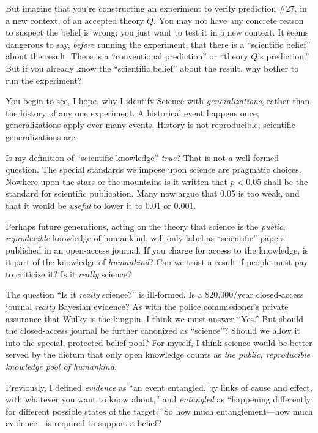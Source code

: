 {
 But imagine that you're constructing an experiment
to verify prediction \#27, in a new context, of an accepted theory $Q$.
You may not have any concrete reason to suspect the belief is wrong;
you just want to test it in a new context. It seems dangerous to say,
\textit{before} running the experiment, that there is a
``scientific belief'' about the
result. There is a ``conventional
prediction'' or ``theory
$Q$'s prediction.'' But if you already
know the ``scientific belief'' about
the result, why bother to run the experiment?}

{
 You begin to see, I hope, why I identify Science with
\textit{generalizations}, rather than the history of any one
experiment. A historical event happens once; generalizations apply over
many events. History is not reproducible; scientific generalizations
are.}

{
 Is my definition of ``scientific
knowledge'' \textit{true}? That is not a well-formed
question. The special standards we impose upon science are pragmatic
choices. Nowhere upon the stars or the mountains is it written that $p
< 0.05$ shall be the standard for scientific publication. Many
now argue that 0.05 is too weak, and that it would be \textit{useful}
to lower it to 0.01 or 0.001.}

{
 Perhaps future generations, acting on the theory that science is
the \textit{public}, \textit{reproducible} knowledge of humankind, will
only label as ``scientific'' papers
published in an open-access journal. If you charge for access to the
knowledge, is it part of the knowledge of \textit{humankind}? Can we
trust a result if people must pay to criticize it? Is it
\textit{really} science?}

{
 The question ``Is it \textit{really}
science?'' is ill-formed. Is a \$20,000/year
closed-access journal \textit{really} Bayesian evidence? As with the
police commissioner's private assurance that Wulky is
the kingpin, I think we must answer
``Yes.'' But should the
closed-access journal be further canonized as
``science''? Should we allow it into
the special, protected belief pool? For myself, I think science would
be better served by the dictum that only open knowledge counts as
\textit{the public, reproducible knowledge pool of humankind.}}

\myendsectiontext




{
 Previously, I defined \textit{evidence} as ``an
event entangled, by links of cause and effect, with whatever you want
to know about,'' and \textit{entangled} as
``happening differently for different possible states
of the target.'' So how much entanglement---how much
evidence---is required to support a belief? }


